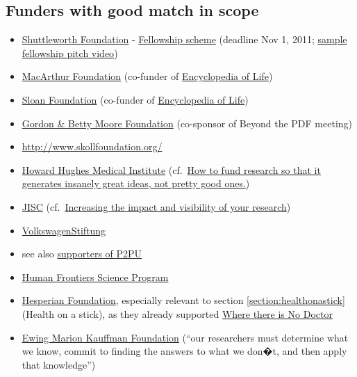 \documentclass[final,authoryear,3p]{elsarticle-open-drafting}
\begin{document}
\subsection{Funders with good match in scope}
\begin{itemize}
	\item \href{http://www.shuttleworthfoundation.org/}{Shuttleworth Foundation} - \href{http://www.shuttleworthfoundation.org/funding/fellowship-programme/}{Fellowship scheme} (deadline Nov 1, 2011; \href{http://vimeo.com/10401282}{sample fellowship pitch video})
	\item \href{http://www.macfound.org}{MacArthur Foundation} (co-funder of \href{http://www.eol.org/}{Encyclopedia of Life})
	\item \href{http://www.sloan.org/}{Sloan Foundation} (co-funder of \href{http://www.eol.org/}{Encyclopedia of Life})
	\item \href{http://www.moore.org/}{Gordon \& Betty Moore Foundation} (co-sponsor of Beyond the PDF meeting)
	\item \href{http://www.skollfoundation.org/}{http://www.skollfoundation.org/}
	\item \href{http://www.hhmi.org/}{Howard Hughes Medical Institute} (cf.\ \href{http://www.slate.com/id/2293699/pagenum/all/#p2}{How to fund research so that it generates insanely great ideas, not pretty good ones.})
	\item \href{http://www.jisc.ac.uk}{JISC} (cf.\  \href{http://www.jisc.ac.uk/supportingyourinstitution/researchexcellence/researchvisibility.aspx}{Increasing the impact and visibility of your research})
	\item \href{http://www.volkswagen-stiftung.de/}{VolkswagenStiftung}
	\item see also \href{http://p2pu.org/general/supporters}{supporters of P2PU}
	\item \href{http://www.hfsp.org/}{Human Frontiers Science Program}
	\item \href{http://www.hesperian.org/publications_download.php}{Hesperian Foundation}, especially relevant to section \ref{section:healthonastick} (Health on a stick), as they already supported \href{http://site.ebrary.com/lib/hesperian/docDetail.action?docID=10411911}{Where there is No Doctor}
	\item \href{http://www.kauffman.org/about-foundation/foundation-overview.aspx}{Ewing Marion Kauffman Foundation} (``our researchers must determine what we know, commit to finding the answers to what we don�t, and then apply that knowledge'')
\end{itemize}
\end{document}
